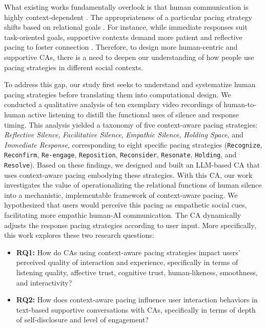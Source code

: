 What existing works fundamentally overlook is that human communication is highly context-dependent \cite{templeton2023listening}. The appropriateness of a particular pacing strategy shifts based on relational goals \cite{lim2025proactivity}. For instance, while immediate responses suit task-oriented goals, supportive contexts demand more patient and reflective pacing to foster connection \cite{kang2018study}. Therefore, to design more human-centric and supportive CAs, there is a need to deepen our understanding of how people use pacing strategies in different social contexts.

To address this gap, our study first seeks to understand and systematize human pacing strategies before translating them into computational design. We conducted a qualitative analysis of ten exemplary video recordings of human-to-human active listening to distill the functional uses of silence and response timing. This analysis yielded a taxonomy of five context-aware pacing strategies: \emph{Reflective Silence}, \emph{Facilitative Silence}, \emph{Empathic Silence}, \emph{Holding Space}, and \emph{Immediate Response}, corresponding to eight specific pacing strategies (\texttt{Recognize}, \texttt{Reconfirm}, \texttt{Re-engage}, \texttt{Reposition}, \texttt{Reconsider}, \texttt{Resonate}, \texttt{Holding}, and \texttt{Resolve}). Based on these findings, we designed and built an LLM-based CA \cite{zeng_ronaldos_2025,zhou_eternagram_2024} that uses context-aware pacing embodying these strategies. 
With this CA, our work investigates the value of operationalizing the relational functions of human silence into a mechanistic, implementable framework of context-aware pacing. We hypothesized that users would perceive this pacing as empathetic social cues, facilitating more empathic human-AI communication.
The CA dynamically adjusts the response pacing strategies according to user input. More specifically, this work explores these two research questions:

\begin{itemize}
    \item \textbf{RQ1:} How do CAs using context-aware pacing strategies impact users' perceived quality of interaction and experience, specifically in terms of listening quality, affective trust, cognitive trust, human-likeness, smoothness, and interactivity?
    \item \textbf{RQ2:} How does context-aware pacing influence user interaction behaviors in text-based supportive conversations with CAs, specifically in terms of depth of self-disclosure and level of engagement?
\end{itemize}


